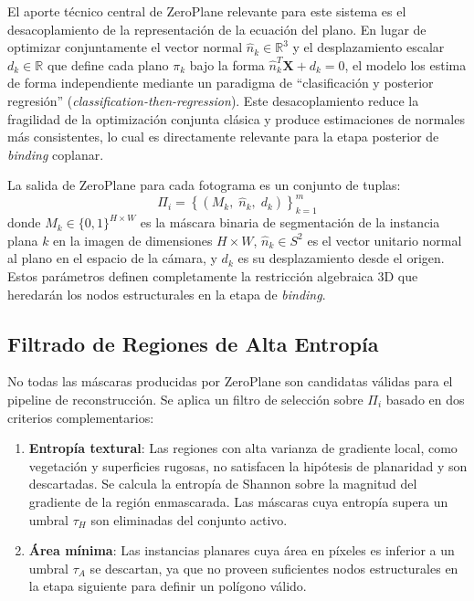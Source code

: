 El aporte técnico central de ZeroPlane relevante para este sistema es el desacoplamiento de la representación de la ecuación del plano. En lugar de optimizar conjuntamente el vector normal $\hat{n}_k \in \mathbb{R}^3$ y el desplazamiento escalar $d_k \in \mathbb{R}$ que define cada plano $\pi_k$ bajo la forma $\hat{n}_k^T \mathbf{X} + d_k = 0$, el modelo los estima de forma independiente mediante un paradigma de ``clasificación y posterior regresión'' (\textit{classification-then-regression}). Este desacoplamiento reduce la fragilidad de la optimización conjunta clásica y produce estimaciones de normales más consistentes, lo cual es directamente relevante para la etapa posterior de \textit{binding} coplanar.
 
La salida de ZeroPlane para cada fotograma es un conjunto de tuplas:
\begin{equation}
    \Pi_i = \left\{ \left( M_k,\; \hat{n}_k,\; d_k \right) \right\}_{k=1}^{m}
\end{equation}
donde $M_k \in \{0,1\}^{H \times W}$ es la máscara binaria de segmentación de la instancia plana $k$ en la imagen de dimensiones $H \times W$, $\hat{n}_k \in S^2$ es el vector unitario normal al plano en el espacio de la cámara, y $d_k$ es su desplazamiento desde el origen. Estos parámetros definen completamente la restricción algebraica 3D que heredarán los nodos estructurales en la etapa de \textit{binding}.
 
\subsection{Filtrado de Regiones de Alta Entropía}
 
No todas las máscaras producidas por ZeroPlane son candidatas válidas para el pipeline de reconstrucción. Se aplica un filtro de selección sobre $\Pi_i$ basado en dos criterios complementarios:
 
\begin{enumerate}
    \item \textbf{Entropía textural}: Las regiones con alta varianza de gradiente local, como vegetación y superficies rugosas, no satisfacen la hipótesis de planaridad y son descartadas. Se calcula la entropía de Shannon sobre la magnitud del gradiente de la región enmascarada. Las máscaras cuya entropía supera un umbral $\tau_H$ son eliminadas del conjunto activo.
    \item \textbf{Área mínima}: Las instancias planares cuya área en píxeles es inferior a un umbral $\tau_A$ se descartan, ya que no proveen suficientes nodos estructurales en la etapa siguiente para definir un polígono válido.
\end{enumerate}
 
